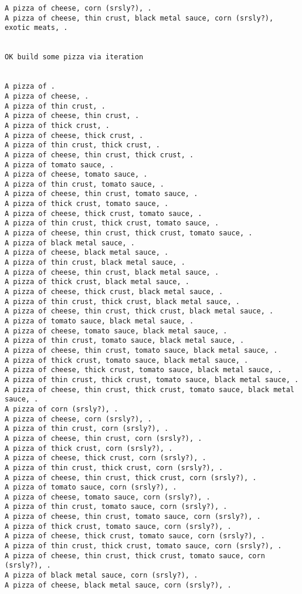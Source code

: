 \documentclass[11pt]{article}
\begin{document}
\begin{enumerate}
\begin{verbatim}
A pizza of cheese, corn (srsly?), .
A pizza of cheese, thin crust, black metal sauce, corn (srsly?), exotic meats, .


OK build some pizza via iteration


A pizza of .
A pizza of cheese, .
A pizza of thin crust, .
A pizza of cheese, thin crust, .
A pizza of thick crust, .
A pizza of cheese, thick crust, .
A pizza of thin crust, thick crust, .
A pizza of cheese, thin crust, thick crust, .
A pizza of tomato sauce, .
A pizza of cheese, tomato sauce, .
A pizza of thin crust, tomato sauce, .
A pizza of cheese, thin crust, tomato sauce, .
A pizza of thick crust, tomato sauce, .
A pizza of cheese, thick crust, tomato sauce, .
A pizza of thin crust, thick crust, tomato sauce, .
A pizza of cheese, thin crust, thick crust, tomato sauce, .
A pizza of black metal sauce, .
A pizza of cheese, black metal sauce, .
A pizza of thin crust, black metal sauce, .
A pizza of cheese, thin crust, black metal sauce, .
A pizza of thick crust, black metal sauce, .
A pizza of cheese, thick crust, black metal sauce, .
A pizza of thin crust, thick crust, black metal sauce, .
A pizza of cheese, thin crust, thick crust, black metal sauce, .
A pizza of tomato sauce, black metal sauce, .
A pizza of cheese, tomato sauce, black metal sauce, .
A pizza of thin crust, tomato sauce, black metal sauce, .
A pizza of cheese, thin crust, tomato sauce, black metal sauce, .
A pizza of thick crust, tomato sauce, black metal sauce, .
A pizza of cheese, thick crust, tomato sauce, black metal sauce, .
A pizza of thin crust, thick crust, tomato sauce, black metal sauce, .
A pizza of cheese, thin crust, thick crust, tomato sauce, black metal sauce, .
A pizza of corn (srsly?), .
A pizza of cheese, corn (srsly?), .
A pizza of thin crust, corn (srsly?), .
A pizza of cheese, thin crust, corn (srsly?), .
A pizza of thick crust, corn (srsly?), .
A pizza of cheese, thick crust, corn (srsly?), .
A pizza of thin crust, thick crust, corn (srsly?), .
A pizza of cheese, thin crust, thick crust, corn (srsly?), .
A pizza of tomato sauce, corn (srsly?), .
A pizza of cheese, tomato sauce, corn (srsly?), .
A pizza of thin crust, tomato sauce, corn (srsly?), .
A pizza of cheese, thin crust, tomato sauce, corn (srsly?), .
A pizza of thick crust, tomato sauce, corn (srsly?), .
A pizza of cheese, thick crust, tomato sauce, corn (srsly?), .
A pizza of thin crust, thick crust, tomato sauce, corn (srsly?), .
A pizza of cheese, thin crust, thick crust, tomato sauce, corn (srsly?), .
A pizza of black metal sauce, corn (srsly?), .
A pizza of cheese, black metal sauce, corn (srsly?), .

\end{verbatim}
\end{enumerate}
\end{document}
